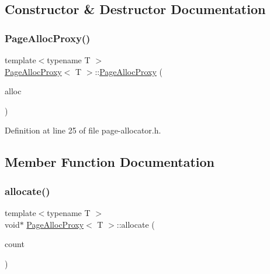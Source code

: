 \subsection{Constructor \& Destructor Documentation}
\mbox{\label{class_page_alloc_proxy_a87bd2d2c09dca3fb6e3d2dc64199624a}} 
\subsubsection{\texorpdfstring{PageAllocProxy()}{PageAllocProxy()}}
{\footnotesize\ttfamily template$<$typename T $>$ \\
\mbox{\hyperlink{class_page_alloc_proxy}{Page\+Alloc\+Proxy}}$<$ T $>$\+::\mbox{\hyperlink{class_page_alloc_proxy}{Page\+Alloc\+Proxy}} (\begin{DoxyParamCaption}\item[{\mbox{\hyperlink{class_page_allocator}{Page\+Allocator}} \&}]{alloc }\end{DoxyParamCaption})\hspace{0.3cm}{\ttfamily [inline]}}



Definition at line 25 of file page-\/allocator.\+h.



\subsection{Member Function Documentation}
\mbox{\label{class_page_alloc_proxy_a6eb35c0d191b75c7448c1dbe722f1241}} 
\subsubsection{\texorpdfstring{allocate()}{allocate()}}
{\footnotesize\ttfamily template$<$typename T $>$ \\
void$\ast$ \mbox{\hyperlink{class_page_alloc_proxy}{Page\+Alloc\+Proxy}}$<$ T $>$\+::allocate (\begin{DoxyParamCaption}\item[{size\+\_\+t}]{count }\end{DoxyParamCaption})\hspace{0.3cm}{\ttfamily [inline]}}



